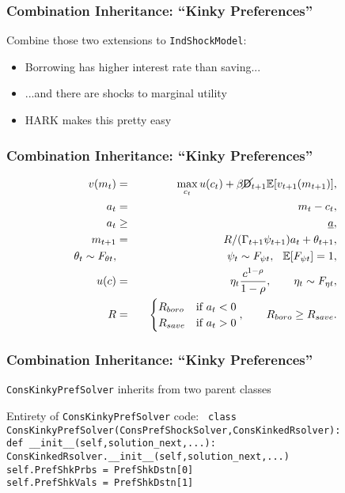 \documentclass[11pt]{cfpbpresentation}
\newcommand{\E}{\mathbb{E}}
\newcommand{\Die}{\mathsf{D}}
\newcommand{\Live}{\cancel{\Die}}
\begin{document}
\begin{frame}
\frametitle{Combination Inheritance: ``Kinky Preferences''}
Combine those two extensions to \texttt{IndShockModel}:
\begin{itemize}
\item Borrowing has higher interest rate than saving...

\item ...and there are shocks to marginal utility

\item HARK makes this pretty easy
\end{itemize}
\end{frame}

\begin{frame}
\frametitle{Combination Inheritance: ``Kinky Preferences''}
\begin{eqnarray*}
v(m_t) &=& \max_{c_t} u(c_t) + \beta \Live_{t+1} \E [v_{t+1}(m_{t+1}) ], \\
a_t &=& m_t - c_t, \\
a_t &\geq& \underline{a}, \\
m_{t+1} &=& R/(\Gamma_{t+1} \psi_{t+1}) a_t + \theta_{t+1}, \\
\theta_t \sim F_{\theta t}, &\qquad& \psi_t \sim F_{\psi t}, \hspace{0.25cm} \E[F_{\psi t}] = 1, \\
u(c) &=& \eta_t \frac{c^{1-\rho}}{1-\rho}, \qquad \eta_t \sim F_{\eta t},\\
R &=& \begin{cases}
R_{boro} & \text{if  } a_t < 0 \\
R_{save} & \text{if  } a_t > 0
\end{cases}, \qquad R_{boro} \geq R_{save}.
\end{eqnarray*}
\end{frame}

\begin{frame}
\frametitle{Combination Inheritance: ``Kinky Preferences''}
\texttt{ConsKinkyPrefSolver} inherits from two parent classes

\begin{block}{Entirety of \texttt{ConsKinkyPrefSolver} code:}
\footnotesize{
\texttt{
class ConsKinkyPrefSolver(ConsPrefShockSolver,ConsKinkedRsolver):\\
\qquad def \_\_init\_\_(self,solution\_next,...):\\
\qquad \qquad ConsKinkedRsolver.\_\_init\_\_(self,solution\_next,...)\\
\qquad \qquad self.PrefShkPrbs = PrefShkDstn[0]\\
\qquad \qquad self.PrefShkVals = PrefShkDstn[1]\\
}}
\end{block}
\end{frame}
\end{document}
